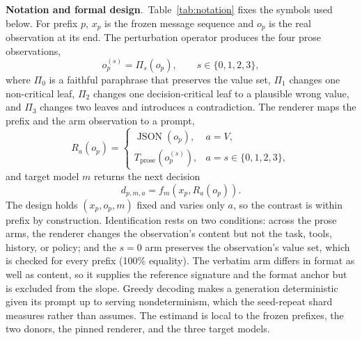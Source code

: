 \documentclass[a4paper,fleqn]{cas-sc}
\begin{document}
\noindent\textbf{Notation and formal design}.\
Table~\ref{tab:notation} fixes the symbols used below. For prefix $p$, $x_p$ is the frozen message
sequence and $o_p$ is the real observation at its end. The perturbation operator produces the
four prose observations,
\begin{equation}
  o_p^{(s)}=\Pi_s(o_p),\qquad s\in\{0,1,2,3\},
  \label{eq:perturb}
\end{equation}
where $\Pi_0$ is a faithful paraphrase that preserves the value set, $\Pi_1$ changes one
non-critical leaf, $\Pi_2$ changes one decision-critical leaf to a plausible wrong value, and
$\Pi_3$ changes two leaves and introduces a contradiction. The renderer maps the prefix and the
arm observation to a prompt,
\begin{equation}
  R_a(o_p)=
  \begin{cases}
    \operatorname{JSON}(o_p), & a=V,\\[2pt]
    T_{\mathrm{prose}}\!\left(o_p^{(s)}\right), & a=s\in\{0,1,2,3\},
  \end{cases}
  \label{eq:render}
\end{equation}
and target model $m$ returns the next decision
\begin{equation}
  d_{p,m,a}=f_m\!\left(x_p,R_a(o_p)\right).
  \label{eq:decision}
\end{equation}
The design holds $(x_p,o_p,m)$ fixed and varies only $a$, so the contrast is within prefix by
construction. Identification rests on two conditions: across the prose arms, the renderer changes
the observation's content but not the task, tools, history, or policy; and the $s=0$ arm preserves
the observation's value set, which is checked for every prefix (100\% equality). The verbatim arm
differs in format as well as content, so it supplies the reference signature and the format anchor
but is excluded from the slope. Greedy decoding makes a generation deterministic given its prompt
up to serving nondeterminism, which the seed-repeat shard measures rather than assumes. The
estimand is local to the frozen prefixes, the two donors, the pinned renderer, and the three target
models.
\end{document}
